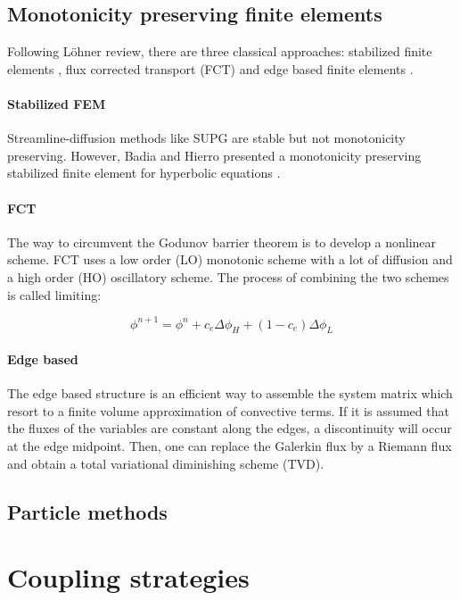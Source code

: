 \subsection{Monotonicity preserving finite elements}

Following Löhner review, there are three classical approaches: stabilized finite elements \cite{lohner2008}, flux corrected transport (FCT) \cite{lohner2008ch9} and edge based finite elements \cite{lohner2008ch10}.

\paragraph*{Stabilized FEM} Streamline-diffusion methods like SUPG are stable but not
monotonicity preserving. However, Badia and Hierro presented a monotonicity preserving stabilized finite element for hyperbolic equations \cite{badia2014}.

\paragraph*{FCT} The way to circumvent the Godunov barrier theorem \cite{godunov1959} is to develop a nonlinear scheme. FCT uses a low order (LO) monotonic scheme with a lot of diffusion and a high order (HO) oscillatory scheme. The process of combining the two schemes is called limiting:

\begin{equation}
\phi^{n+1} = \phi^n + c_e\Delta \phi_H + (1-c_e)\Delta \phi_L
\end{equation}

\paragraph*{Edge based} The edge based structure is an efficient way to assemble the system matrix which resort to a
finite volume approximation of convective terms. If it is assumed that the fluxes of the variables are constant along the edges, a discontinuity will occur at the edge midpoint. Then, one can replace the Galerkin flux by a Riemann flux and obtain a total variational diminishing scheme (TVD).


\subsection{Particle methods}



\section{Coupling strategies}


